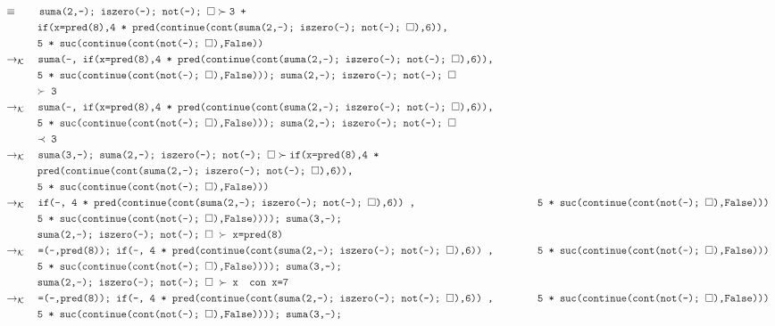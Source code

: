 \documentclass{article}
\newcommand{\tx}[1]{\textcolor{Black} {\texttt{#1}}}
\newcommand{\es}{$\square$}
\newcommand{\pop}[2]{ \tx{#1} \succ \tx{#2}}
\newcommand{\kr}{\rightarrow_{\mathcal{K}} \quad}
\begin{document}
\begin{enumerate}
\begin{enumerate}
\begin{align*}
			& \equiv \quad \quad \pop{suma(2,-); iszero(-); not(-); \es}{3 +}\\
			&\tx{\quad \quad \quad if(x=pred(8),4 * pred(continue(cont(suma(2,-); iszero(-); not(-); \es),6)),}\\
			&\tx{\quad \quad \quad 5 * suc(continue(cont(not(-); \es),False))}\\
			& \kr \tx{suma(-, if(x=pred(8),4 * pred(continue(cont(suma(2,-); iszero(-); not(-); \es),6)),}\\
			&\tx{\quad \quad \quad5 * suc(continue(cont(not(-); \es),False))); suma(2,-); iszero(-); not(-); \es}\\
			&\tx{\quad \quad \quad $\succ$ 3}\\
			& \kr \tx{suma(-, if(x=pred(8),4 * pred(continue(cont(suma(2,-); iszero(-); not(-); \es),6)),}\\
			&\tx{\quad \quad \quad5 * suc(continue(cont(not(-); \es),False))); suma(2,-); iszero(-); not(-); \es}\\
			&\tx{\quad \quad \quad $\prec$ 3}\\
			&\kr \pop{suma(3,-); suma(2,-); iszero(-); not(-); \es}{if(x=pred(8),4 *}\\
			&\tx{\quad \quad \quad pred(continue(cont(suma(2,-); iszero(-); not(-); \es),6)),}\\
			&\tx{\quad \quad \quad 5 * suc(continue(cont(not(-); \es),False)))}\\
			&\kr \tx{if(-, 4 * pred(continue(cont(suma(2,-); iszero(-); not(-); \es),6)) ,}
			&\tx{\quad \quad \quad 5 * suc(continue(cont(not(-); \es),False)))}\\
			&\tx {\quad \quad \quad 5 * suc(continue(cont(not(-); \es),False)))); suma(3,-);}\\
			&\tx{\quad \quad \quad suma(2,-); iszero(-); not(-); \es $\ \succ $ x=pred(8)}\\
			&\kr \tx{=(-,pred(8)); if(-, 4 * pred(continue(cont(suma(2,-); iszero(-); not(-); \es),6)) ,}
			&\tx{\quad \quad \quad 5 * suc(continue(cont(not(-); \es),False)))}\\
			&\tx {\quad \quad \quad 5 * suc(continue(cont(not(-); \es),False)))); suma(3,-);}\\
			&\tx{\quad \quad \quad suma(2,-); iszero(-); not(-); \es $\ \succ $ x} \tx{\quad con x=7}\\	
			&\kr \tx{=(-,pred(8)); if(-, 4 * pred(continue(cont(suma(2,-); iszero(-); not(-); \es),6)) ,}
			&\tx{\quad \quad \quad 5 * suc(continue(cont(not(-); \es),False)))}\\
			&\tx {\quad \quad \quad 5 * suc(continue(cont(not(-); \es),False)))); suma(3,-);}\\

\end{align*}
\end{enumerate}
\end{enumerate}
\end{document}
